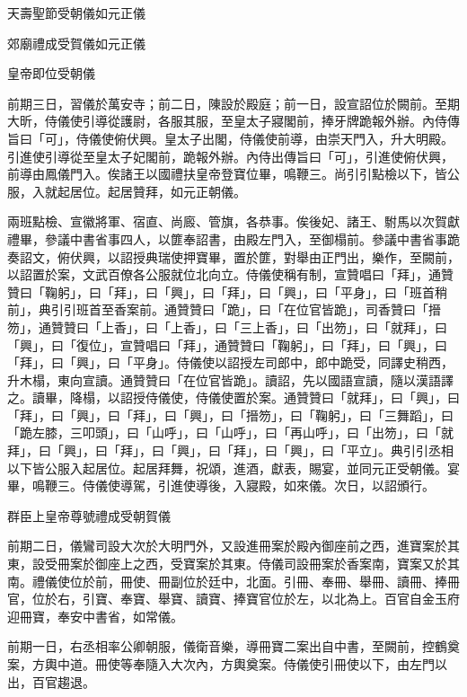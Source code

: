 \begin{pinyinscope}
 天壽聖節受朝儀如元正儀



 郊廟禮成受賀儀如元正儀



 皇帝即位受朝儀



 前期三日，習儀於萬安寺；前二日，陳設於殿庭；前一日，設宣詔位於闕前。至期大昕，侍儀使引導從護尉，各服其服，至皇太子寢閣前，捧牙牌跪報外辦。內侍傳旨曰「可」，侍儀使俯伏興。皇太子出閣，侍儀使前導，由崇天門入，升大明殿。引進使引導從至皇太子妃閣前，跪報外辦。內侍出傳旨曰「可」，引進使俯伏興，前導由鳳儀門入。俟諸王以國禮扶皇帝登寶位畢，鳴鞭三。尚引引點檢以下，皆公服，入就起居位。起居贊拜，如元正朝儀。



 兩班點檢、宣徽將軍、宿直、尚廄、管旗，各恭事。俟後妃、諸王、駙馬以次賀獻禮畢，參議中書省事四人，以篚奉詔書，由殿左門入，至御榻前。參議中書省事跪奏詔文，俯伏興，以詔授典瑞使押寶畢，置於篚，對舉由正門出，樂作，至闕前，以詔置於案，文武百僚各公服就位北向立。侍儀使稱有制，宣贊唱曰「拜」，通贊贊曰「鞠躬」，曰「拜」，曰「興」，曰「拜」，曰「興」，曰「平身」，曰「班首稍前」，典引引班首至香案前。通贊贊曰「跪」，曰「在位官皆跪」，司香贊曰「搢笏」，通贊贊曰「上香」，曰「上香」，曰「三上香」，曰「出笏」，曰「就拜」，曰「興」，曰「復位」，宣贊唱曰「拜」，通贊贊曰「鞠躬」，曰「拜」，曰「興」，曰「拜」，曰「興」，曰「平身」。侍儀使以詔授左司郎中，郎中跪受，同譯史稍西，升木榻，東向宣讀。通贊贊曰「在位官皆跪」。讀詔，先以國語宣讀，隨以漢語譯之。讀畢，降榻，以詔授侍儀使，侍儀使置於案。通贊贊曰「就拜」，曰「興」，曰「拜」，曰「興」，曰「拜」，曰「興」，曰「搢笏」，曰「鞠躬」，曰「三舞蹈」，曰「跪左膝，三叩頭」，曰「山呼」，曰「山呼」，曰「再山呼」，曰「出笏」，曰「就拜」，曰「興」，曰「拜」，曰「興」，曰「拜」，曰「興」，曰「平立」。典引引丞相以下皆公服入起居位。起居拜舞，祝頌，進酒，獻表，賜宴，並同元正受朝儀。宴畢，鳴鞭三。侍儀使導駕，引進使導後，入寢殿，如來儀。次日，以詔頒行。



 群臣上皇帝尊號禮成受朝賀儀



 前期二日，儀鸞司設大次於大明門外，又設進冊案於殿內御座前之西，進寶案於其東，設受冊案於御座上之西，受寶案於其東。侍儀司設冊案於香案南，寶案又於其南。禮儀使位於前，冊使、冊副位於廷中，北面。引冊、奉冊、舉冊、讀冊、捧冊官，位於右，引寶、奉寶、舉寶、讀寶、捧寶官位於左，以北為上。百官自金玉府迎冊寶，奉安中書省，如常儀。



 前期一日，右丞相率公卿朝服，儀衛音樂，導冊寶二案出自中書，至闕前，控鶴奠案，方輿中道。冊使等奉隨入大次內，方輿奠案。侍儀使引冊使以下，由左門以出，百官趨退。




\end{pinyinscope}
